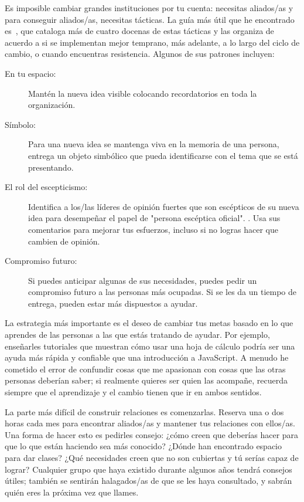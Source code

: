 Es imposible cambiar grandes instituciones por tu cuenta:
necesitas aliados/as
y para conseguir aliados/as,
necesitas tácticas.
La guía más útil que he encontrado es~\cite{Mann2015}, 
que cataloga más de cuatro docenas de estas tácticas
y las organiza de acuerdo a si se implementan mejor temprano,
más adelante,
a lo largo del ciclo de cambio,
o cuando encuentras resistencia.
Algunos de sus patrones incluyen:

\begin{description}

\item[En tu espacio:]
Mantén la nueva idea visible
colocando recordatorios en toda la organización.

\item[Símbolo:] 
Para una nueva idea se mantenga viva en la memoria de una persona,
entrega un objeto simbólico  que pueda identificarse con el tema que se está presentando.

\item[El rol del escepticismo:]
Identifica a los/las líderes de opinión fuertes que son escépticos de su nueva idea para desempeñar el papel de "persona escéptica oficial". .
Usa sus comentarios para mejorar tus esfuerzos,
incluso si no logras hacer que cambien de opinión.

\item[Compromiso futuro:]
 
Si puedes anticipar algunas de sus necesidades,
puedes pedir un compromiso futuro a las personas más ocupadas.
Si se les da un tiempo de entrega,
pueden estar más dispuestos a ayudar.

\end{description}

La estrategia más importante es
el deseo de cambiar tus metas
basado en lo que aprendes de las personas a las que estás tratando de ayudar.
Por ejemplo, enseñarles tutoriales que muestran cómo usar una hoja de cálculo
podría ser una ayuda más rápida y confiable que 
una introducción a JavaScript.
A menudo he cometido el error de confundir cosas que me apasionan
con cosas que las otras personas deberían saber;
si realmente quieres ser quien las acompañe,
recuerda siempre que el aprendizaje y el cambio tienen que ir en ambos sentidos.

La parte más difícil de construir relaciones es comenzarlas.
Reserva una o dos horas cada mes
para encontrar aliados/as y mantener tus relaciones con ellos/as.
Una forma de hacer esto es pedirles consejo:
¿cómo creen que deberías hacer para que lo que están haciendo sea más conocido?
¿Dónde han encontrado espacio para dar clases?
¿Qué necesidades creen que no son cubiertas
y tú serías capaz de lograr?
Cualquier grupo que haya existido durante algunos años tendrá consejos útiles;
también se sentirán halagados/as de que se les haya consultado,
y sabrán quién eres la próxima vez que llames.


